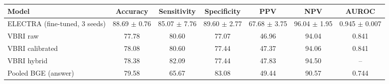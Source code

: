 \begin{tabular}{@{}lcccccc@{}}
\toprule
\textbf{Model} & \textbf{Accuracy} & \textbf{Sensitivity} & \textbf{Specificity} & \textbf{PPV} & \textbf{NPV} & \textbf{AUROC} \\
\midrule
ELECTRA (fine-tuned, 3 seeds) & 88.69 $\pm$ 0.76 & 85.07 $\pm$ 7.76 & 89.60 $\pm$ 2.77 & 67.68 $\pm$ 3.75 & 96.04 $\pm$ 1.95 & 0.945 $\pm$ 0.007 \\
VBRI raw & 77.78 & 80.60 & 77.07 & 46.96 & 94.04 & 0.841 \\
VBRI calibrated & 78.08 & 80.60 & 77.44 & 47.37 & 94.06 & 0.841 \\
VBRI hybrid & 78.38 & 82.09 & 77.44 & 47.83 & 94.50 & -- \\
Pooled BGE (answer) & 79.58 & 65.67 & 83.08 & 49.44 & 90.57 & 0.744 \\
\bottomrule
\end{tabular}
